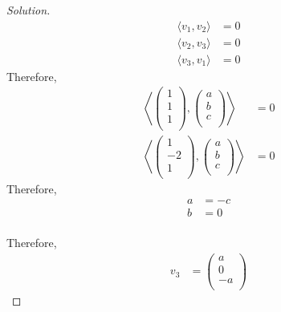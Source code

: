 \documentclass[fleqn, a4paper, 12pt]{article}
\theoremstyle{definition}
\theoremstyle{theorem}
\newenvironment{solution}
{\begin{proof}[Solution]\let\qed\relax}
	{\end{proof}}
\begin{document}
\begin{solution}
	\begin{align*}
		\langle v_1, v_2 \rangle &= 0\\
		\langle v_2, v_3 \rangle &= 0\\
		\langle v_3, v_1 \rangle &= 0
	\end{align*}
	Therefore,
	\begin{align*}
			\left\langle
				\begin{pmatrix}
					1\\
					1\\
					1\\
				\end{pmatrix}
				,
				\begin{pmatrix}
					a\\
					b\\
					c\\
				\end{pmatrix}
			\right\rangle
		&= 0\\
			\left\langle
				\begin{pmatrix}
					1\\
					-2\\
					1\\
				\end{pmatrix}
				,
				\begin{pmatrix}
					a\\
					b\\
					c\\
				\end{pmatrix}
			\right\rangle
		&= 0
	\end{align*}
	Therefore,
	\begin{align*}
		a &= -c\\
		b &= 0
	\end{align*}\\
	Therefore,
	\begin{align*}
		v_3 &= 
			\begin{pmatrix}
				a\\
				0\\
				-a\\
			\end{pmatrix}
	\end{align*}
\end{solution}
\end{document}
